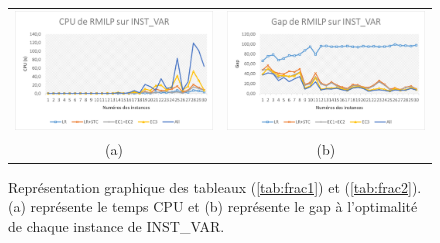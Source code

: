 {\begin{figure}[H]
	\centering
	\begin{tabular}{c c}
		\includegraphics[width=9cm]{images_these/CPU_RMILP_INST_VAR.pdf}&
		\includegraphics[width=9cm]{images_these/Gap_RMILP_INST_VAR.pdf}
		\\
		(a) & (b)
	\end{tabular}
	\caption[Représentation graphique du CPU et du gap des tableaux (\ref{tab:frac1}) et (\ref{tab:frac2})]{Représentation graphique des tableaux (\ref{tab:frac1}) et (\ref{tab:frac2}). (a) représente le temps CPU et (b) représente le gap à l'optimalité de chaque instance de INST\_VAR.}\label{gap_cpu_RMILP_INST_VAR}
\end{figure}

}
